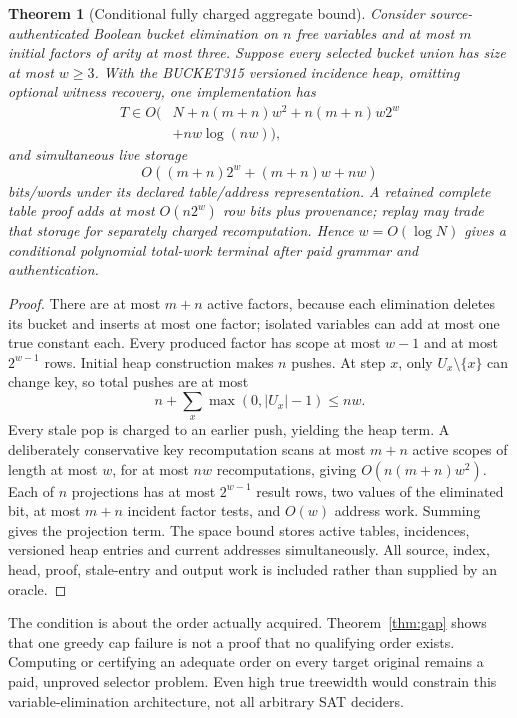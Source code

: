 \documentclass[11pt]{article}
\newtheorem{theorem}{Theorem}
\begin{document}
\begin{theorem}[Conditional fully charged aggregate bound]\label{thm:bound}
Consider source-authenticated Boolean bucket elimination on $n$ free variables and at most $m$ initial factors of arity at most three.  Suppose every selected bucket union has size at most $w\ge3$.  With the BUCKET315 versioned incidence heap, omitting optional witness recovery, one implementation has
\[
\begin{split}
T \in O(&N+n(m+n)w^2+n(m+n)w2^w\\
        &+nw\log(nw)),
\end{split}
\]
and simultaneous live storage
\[
O((m+n)2^w+(m+n)w+nw)
\]
bits/words under its declared table/address representation.  A retained complete table proof adds at most $O(n2^w)$ row bits plus provenance; replay may trade that storage for separately charged recomputation.  Hence $w=O(\log N)$ gives a conditional polynomial total-work terminal after paid grammar and authentication.
\end{theorem}
\begin{proof}
There are at most $m+n$ active factors, because each elimination deletes its bucket and inserts at most one factor; isolated variables can add at most one true constant each.  Every produced factor has scope at most $w-1$ and at most $2^{w-1}$ rows.  Initial heap construction makes $n$ pushes.  At step $x$, only $U_x\setminus\{x\}$ can change key, so total pushes are at most
\[
n+\sum_x\max(0,|U_x|-1)\le nw.
\]
Every stale pop is charged to an earlier push, yielding the heap term.  A deliberately conservative key recomputation scans at most $m+n$ active scopes of length at most $w$, for at most $nw$ recomputations, giving $O(n(m+n)w^2)$.  Each of $n$ projections has at most $2^{w-1}$ result rows, two values of the eliminated bit, at most $m+n$ incident factor tests, and $O(w)$ address work.  Summing gives the projection term.  The space bound stores active tables, incidences, versioned heap entries and current addresses simultaneously.  All source, index, head, proof, stale-entry and output work is included rather than supplied by an oracle.
\end{proof}

The condition is about the order actually acquired.  Theorem~\ref{thm:gap} shows that one greedy cap failure is not a proof that no qualifying order exists.  Computing or certifying an adequate order on every target original remains a paid, unproved selector problem.  Even high true treewidth would constrain this variable-elimination architecture, not all arbitrary SAT deciders.
\end{document}
